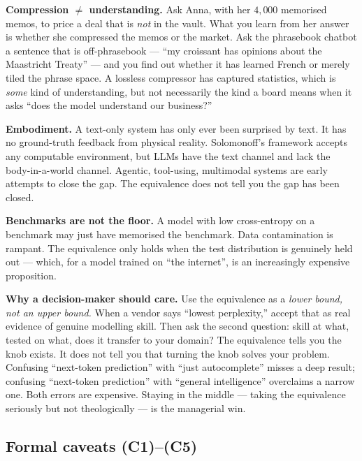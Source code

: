 \documentclass[12pt,a4paper]{article}
\theoremstyle{plain}
\theoremstyle{definition}
\begin{document}
\begin{intuition}
\medskip

\noindent\textbf{Compression $\ne$ understanding.}
Ask Anna, with her $4{,}000$ memorised memos, to price a deal that
is \emph{not} in the vault. What you learn from her answer is
whether she compressed the memos or the market. Ask the phrasebook
chatbot a sentence that is off-phrasebook --- ``my croissant has
opinions about the Maastricht Treaty'' --- and you find out whether
it has learned French or merely tiled the phrase space. A lossless
compressor has captured statistics, which is \emph{some} kind of
understanding, but not necessarily the kind a board means when it
asks ``does the model understand our business?''

\medskip

\noindent\textbf{Embodiment.}
A text-only system has only ever been surprised by text. It has no
ground-truth feedback from physical reality. Solomonoff's framework
accepts any computable environment, but LLMs have the text channel
and lack the body-in-a-world channel. Agentic, tool-using,
multimodal systems are early attempts to close the gap. The
equivalence does not tell you the gap has been closed.

\medskip

\noindent\textbf{Benchmarks are not the floor.}
A model with low cross-entropy on a benchmark may just have
memorised the benchmark. Data contamination is rampant. The
equivalence only holds when the test distribution is genuinely held
out --- which, for a model trained on ``the internet'', is an
increasingly expensive proposition.

\medskip

\noindent\textbf{Why a decision-maker should care.} Use the
equivalence as a \emph{lower bound, not an upper bound.} When a
vendor says ``lowest perplexity,'' accept that as real evidence of
genuine modelling skill. Then ask the second question: skill at
what, tested on what, does it transfer to your domain? The
equivalence tells you the knob exists. It does not tell you that
turning the knob solves your problem. Confusing ``next-token
prediction'' with ``just autocomplete'' misses a deep result;
confusing ``next-token prediction'' with ``general intelligence''
overclaims a narrow one. Both errors are expensive. Staying in the
middle --- taking the equivalence seriously but not theologically
--- is the managerial win.
\end{intuition}

\subsection*{Formal caveats (C1)--(C5)}
\label{sec:formal-caveats}
\end{document}
